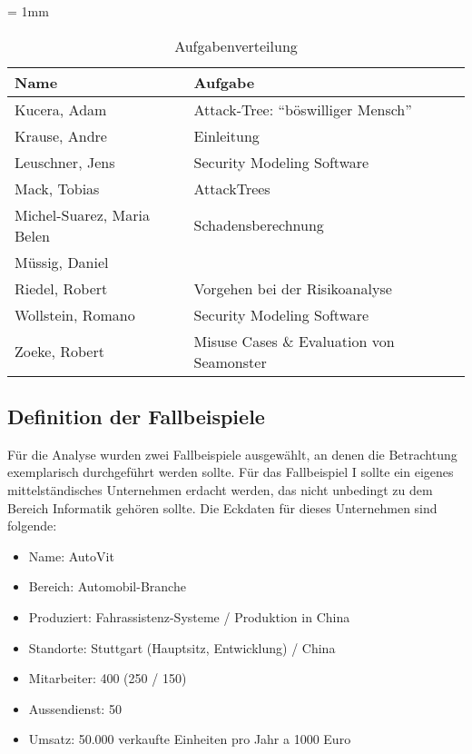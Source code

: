 \begin{table}[H]
	\sffamily
	\caption{Aufgabenverteilung}
	\tabulinesep = 1mm %
	\centering
		\begin{tabu} to 0.9\textwidth { X[1.5]  X[3] }
		\hline
		\textbf{Name} & \textbf{Aufgabe}\\
		\hline 
		Kucera, Adam & Attack-Tree: "`böswilliger Mensch"'\\

		Krause, Andre & Einleitung\\

		Leuschner, Jens & Security Modeling Software\\

		Mack, Tobias & AttackTrees\\

		Michel-Suarez, Maria Belen & Schadensberechnung\\

		Müssig, Daniel & \\

		Riedel, Robert & Vorgehen bei der Risikoanalyse\\

		Wollstein, Romano & Security Modeling Software\\

		Zoeke, Robert & Misuse Cases \& Evaluation von Seamonster\\

	\end{tabu}
\end{table}

\subsection{Definition der Fallbeispiele}
Für die Analyse wurden zwei Fallbeispiele ausgewählt, an denen die Betrachtung exemplarisch durchgeführt werden sollte. Für das Fallbeispiel I sollte ein eigenes mittelständisches Unternehmen erdacht werden, das nicht unbedingt zu dem Bereich Informatik gehören sollte. Die Eckdaten für dieses Unternehmen sind folgende:

\begin{itemize}
\item Name: AutoVit
\item Bereich: Automobil-Branche
\item Produziert: Fahrassistenz-Systeme / Produktion in China
\item Standorte: Stuttgart (Hauptsitz, Entwicklung) / China
\item Mitarbeiter: 400 (250 / 150)
\item Aussendienst: 50
\item Umsatz: 50.000 verkaufte Einheiten pro Jahr a 1000 Euro
\end{itemize}

